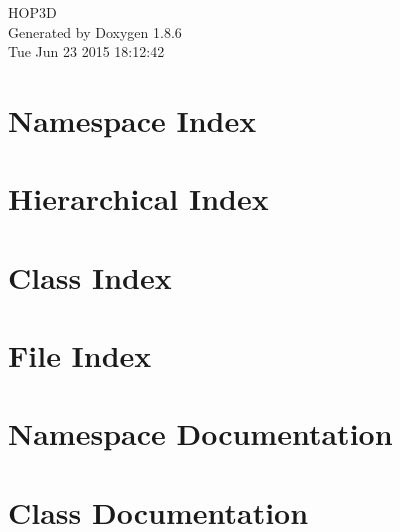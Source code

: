 \documentclass[twoside]{book}
\newcommand{\clearemptydoublepage}{%
  \newpage{\pagestyle{empty}\cleardoublepage}%
}
\begin{document}
\hypersetup{pageanchor=false}
\begin{titlepage}
\vspace*{7cm}
\begin{center}%
{\Large H\-O\-P3\-D }\\
\vspace*{1cm}
{\large Generated by Doxygen 1.8.6}\\
\vspace*{0.5cm}
{\small Tue Jun 23 2015 18:12:42}\\
\end{center}
\end{titlepage}
\clearemptydoublepage
\tableofcontents
\clearemptydoublepage
{}
\hypersetup{pageanchor=true}

\chapter{Namespace Index}

\chapter{Hierarchical Index}

\chapter{Class Index}

\chapter{File Index}

\chapter{Namespace Documentation}

\chapter{Class Documentation}















\end{document}
